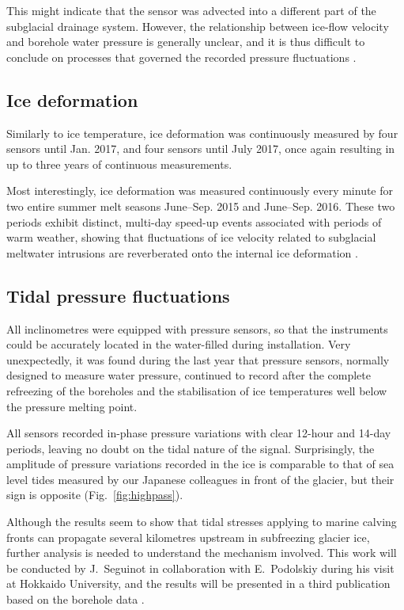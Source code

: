 \documentclass{article}
\begin{document}
    This might indicate that the sensor was advected into a different part of
    the subglacial drainage system. However, the relationship between ice-flow
    velocity and borehole water pressure is generally unclear, and it is thus
    difficult to conclude on processes that governed the recorded pressure
    fluctuations \citep{Podolskiy.etal.Inprep}.


\subsection{Ice deformation}

    Similarly to ice temperature, ice deformation was continuously measured by
    four sensors until Jan. 2017, and four sensors until July 2017, once again
    resulting in up to three years of continuous measurements.

    Most interestingly, ice deformation was measured continuously every minute
    for two entire summer melt seasons June--Sep. 2015 and June--Sep. 2016.
    These two periods exhibit distinct, multi-day speed-up events associated
    with periods of warm weather, showing that fluctuations of ice velocity
    related to subglacial meltwater intrusions are reverberated onto the
    internal ice deformation \citep{Seguinot.etal.Inprep}.


\subsection{Tidal pressure fluctuations}

    All inclinometres were equipped with pressure sensors, so that the
    instruments could be accurately located in the water-filled during
    installation. Very unexpectedly, it was found during the last year that
    pressure sensors, normally designed to measure water pressure, continued to
    record after the complete refreezing of the boreholes and the stabilisation
    of ice temperatures well below the pressure melting point.

    All sensors recorded in-phase pressure variations with clear 12-hour and
    14-day periods, leaving no doubt on the tidal nature of the signal.
    Surprisingly, the amplitude of pressure variations recorded in the ice is
    comparable to that of sea level tides measured by our Japanese colleagues
    in front of the glacier, but their sign is opposite
    (Fig.~\ref{fig:highpass}).

    Although the results seem to show that tidal stresses applying to marine
    calving fronts can propagate several kilometres upstream in subfreezing
    glacier ice, further analysis is needed to understand the mechanism
    involved. This work will be conducted by J.~Seguinot in collaboration with
    E.~Podolskiy during his visit at Hokkaido University, and the results will
    be presented in a third publication based on the borehole data
    \citep{Seguinot.etal.Inprepa}.
\end{document}
